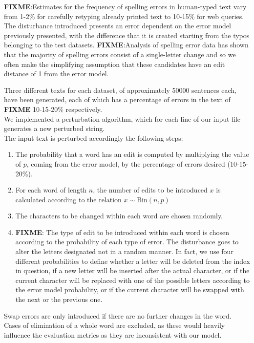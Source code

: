 {\textbf{FIXME}:Estimates for the frequency of spelling errors in human-typed text vary from 1-2\% for carefully 
retyping already printed text to 10-15\% for web queries.
The disturbance introduced presents an error dependent on the error model previously presented, with the 
difference that it is created starting from the typos belonging to the test datasets.
\textbf{FIXME}:{Analysis of spelling error data has shown that the majority of spelling errors consist of a 
single-letter change and so we often make the simplifying assumption that these candidates have an edit 
distance of 1 from the error model.}

Three different texts for each dataset, of approximately \num{50000} sentences each, have been generated, 
each of which has a percentage of errors in the text of \textbf{FIXME} \num{10}-\num{15}-\num{20}\% 
respectively. \\

We implemented a perturbation algorithm, which for each line of our input file generates a new perturbed 
string.\\
The input text is perturbed accordingly the following steps:

\begin{enumerate}
	\item The probability that a word has an edit is computed by multiplying the value of $p$, coming from the 
	error model, by the percentage of errors desired (10-15-20\%).
	\item For each word of length $n$, the number of edits to be introduced $x$ is calculated according to the 
	relation $x \sim \text{Bin}(n, p)$
	\item The characters to be changed within each word are chosen randomly.
	\item \textbf{FIXME}: The type of edit to be introduced within each word is chosen according to the 
	probability of each type of error. 
	The disturbance goes to alter the letters designated not in a random manner. 
	In fact, we use four different probabilities to define whether a letter will be deleted from the index in question, 
	if a new letter will be inserted after the actual character, or if the current character will be replaced with one of 
	the possible letters according to the error model probability, or if the current character will be swapped with 
	the next or the previous one.
	
\end{enumerate}

Swap errors are only introduced if there are no further changes in the word. Cases of elimination of a whole 
word are excluded, as these would heavily influence the evaluation metrics as they are inconsistent with our 
model. 

}
